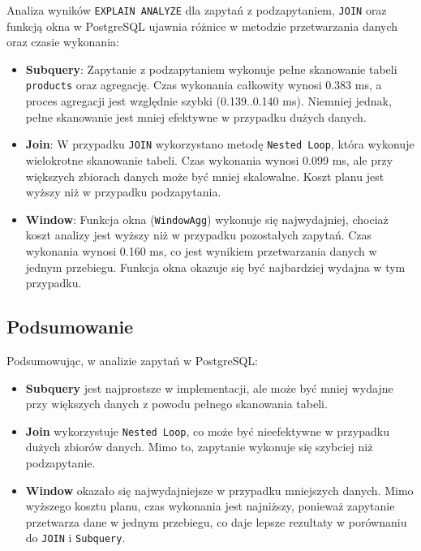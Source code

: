 \documentclass{article}
\begin{document}
Analiza wyników \texttt{EXPLAIN ANALYZE} dla zapytań z podzapytaniem, \texttt{JOIN} oraz funkcją okna w PostgreSQL ujawnia różnice w metodzie przetwarzania danych oraz czasie wykonania:

\begin{itemize}
    \item \textbf{Subquery}: Zapytanie z podzapytaniem wykonuje pełne skanowanie tabeli \texttt{products} oraz agregację. Czas wykonania całkowity wynosi 0.383 ms, a proces agregacji jest względnie szybki (0.139..0.140 ms). Niemniej jednak, pełne skanowanie jest mniej efektywne w przypadku dużych danych.
    
    \item \textbf{Join}: W przypadku \texttt{JOIN} wykorzystano metodę \texttt{Nested Loop}, która wykonuje wielokrotne skanowanie tabeli. Czas wykonania wynosi 0.099 ms, ale przy większych zbiorach danych może być mniej skalowalne. Koszt planu jest wyższy niż w przypadku podzapytania.
    
    \item \textbf{Window}: Funkcja okna (\texttt{WindowAgg}) wykonuje się najwydajniej, chociaż koszt analizy jest wyższy niż w przypadku pozostałych zapytań. Czas wykonania wynosi 0.160 ms, co jest wynikiem przetwarzania danych w jednym przebiegu. Funkcja okna okazuje się być najbardziej wydajna w tym przypadku.
\end{itemize}

\subsection*{Podsumowanie}

Podsumowując, w analizie zapytań w PostgreSQL:
\begin{itemize}
    \item \textbf{Subquery} jest najprostsze w implementacji, ale może być mniej wydajne przy większych danych z powodu pełnego skanowania tabeli.
    \item \textbf{Join} wykorzystuje \texttt{Nested Loop}, co może być nieefektywne w przypadku dużych zbiorów danych. Mimo to, zapytanie wykonuje się szybciej niż podzapytanie.
    \item \textbf{Window} okazało się najwydajniejsze w przypadku mniejszych danych. Mimo wyższego kosztu planu, czas wykonania jest najniższy, ponieważ zapytanie przetwarza dane w jednym przebiegu, co daje lepsze rezultaty w porównaniu do \texttt{JOIN} i \texttt{Subquery}.
\end{itemize}
\end{document}
